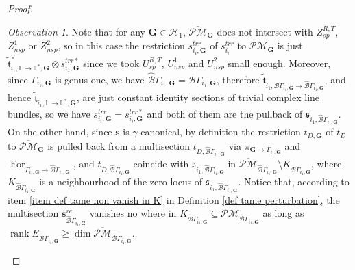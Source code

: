 \documentclass[11pt]{amsart}
\theoremstyle{definition}
\theoremstyle{remark}
\newtheorem{obs}[dummy]{Observation}
\newcommand{\oPMb}{{\overline{\mathcal{PM}}}}
\newcommand{\nontilde}{}
\newcommand{\<}{\left<}
\renewcommand{\>}{\right>}
\numberwithin{equation}{section}
\DeclareMathOperator{\rk}{rank}
\begin{document}
\begin{proof}
    \begin{obs}\label{obs on genus one K}
        Note that for any $\bm{G}\in \bm{\mathcal H}_1$, $\oPMb_{\bm{G}}$ does not intersect with $Z^{R,T}_{sp}$, $Z^1_{nsp}$ or $Z^2_{nsp}$, so in this case the restriction $s_{i_i,\bm{G}}^{trr}$ of $s_{i_i}^{trr}$ to $\oPMb_{\bm{G}}$ is just  $\tilde{\mathfrak{t}}^{\vee}_{i_1,\mathbb L \to \mathbb L^*,\bm{G}}\otimes \nontilde{s}^{trr*}_{i_1,\bm{G}}$ since we took $U^{R,T}_{sp}$, $U^1_{nsp}$ and $U^2_{nsp}$ small enough. 
        Moreover, since $\Gamma_{i_1,\bm{G}}$ is genus-one, we have $\hat{\mathcal B}\Gamma_{i_1,\bm{G}}=\mathcal B \Gamma_{i_1,\bm{G}}$, therefore $\tilde{\mathfrak{t}}_{i_1,{\mathcal B}\Gamma_{i_1,\bm{G}} \to \hat{\mathcal B}\Gamma_{i_1,\bm{G}}}$, and hence $\tilde{\mathfrak{t}}_{i_1,\mathbb L \to \mathbb L^*,\bm{G}}$, are just constant identity sections of trivial complex line bundles, so we have        $s_{i_i,\bm{G}}^{trr}=s_{i_i,\bm{G}}^{trr*}$ and both of them are the pullback of $\mathfrak s_{i_1, \hat{\mathcal B}\Gamma_{i_1,\bm{G}}}$.
        On the other hand, since $\bm{s}$ is $\gamma$-canonical, by definition the restriction $t_{D,\bm{G}}$ of $t_D$ to $\oPMb_{\bm{G}}$ is pulled back from a multisection $t_{D,\hat{\mathcal B} \Gamma_{i_1,\bm{G}}}$ via $\pi_{\bm{G}\to \Gamma_{i_1,\bm{G}}}$ and $\operatorname{For}_{\Gamma_{i_1,\bm{G}}\to \hat{\mathcal B} \Gamma_{i_1,\bm{G}}}$, 
        and $t_{D,\hat{\mathcal B} \Gamma_{i_1,\bm{G}}}$ coincide with $\mathfrak s_{i_1,\hat{\mathcal B} \Gamma_{i_1,\bm{G}}}$ in $\oPMb_{\hat{\mathcal B} \Gamma_{i_1,\bm{G}}}\setminus K_{\hat{\mathcal B} \Gamma_{i_1,\bm{G}}}$, where $K_{\hat{\mathcal B} \Gamma_{i_1,\bm{G}}}$ is a neighbourhood of the zero locus of $\mathfrak s_{i_1,\hat{\mathcal B} \Gamma_{i_1,\bm{G}}}$. 
        Notice that, according to item \ref{item def tame non vanish in K} in Definition \ref{def tame perturbation}, 
        the multisection $\bm{s}^{re}_{\hat{\mathcal B} \Gamma_{i_1,\bm{G}}}$ vanishes no where in $K_{\hat{\mathcal B }\Gamma_{i_1,\bm{G}}}\subseteq \oPMb_{\hat{\mathcal B} \Gamma_{i_1,\bm{G}}}$ as long as 
        $
        \rk E_{\hat{\mathcal B} \Gamma_{i_1,\bm{G}}}\ge \dim \oPMb_{\hat{\mathcal B} \Gamma_{i_1,\bm{G}}}.
        $
    
        \end{obs}
        

\end{proof}
\end{document}
